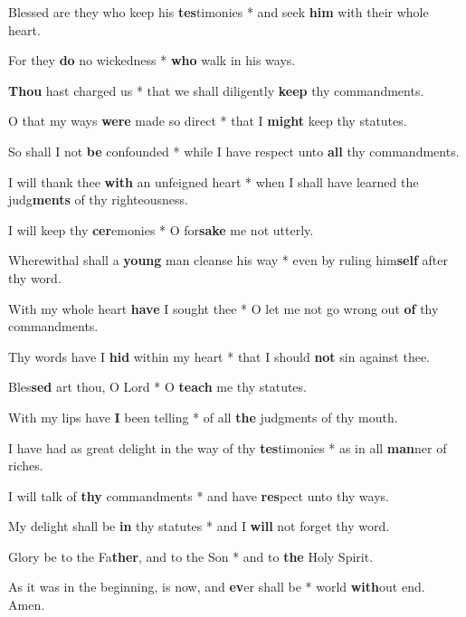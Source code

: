 \begin{multicols}{2}
	Blessed are they who keep his \textbf{tes}timonies * and seek \textbf{him} with their whole heart.
	
	For they \textbf{do} no wickedness * \textbf{who} walk in his ways.
	
	\textbf{Thou} hast charged us * that we shall diligently \textbf{keep} thy commandments.
	
	O that my ways \textbf{were} made so direct * that I \textbf{might} keep thy statutes.
		
	So shall I not \textbf{be} confounded * while I have respect unto \textbf{all} thy commandments.
	
	I will thank thee \textbf{with} an unfeigned heart * when I shall have learned the judg\textbf{ments} of thy righteousness.
	
	I will keep thy \textbf{cer}emonies * O for\textbf{sake} me not utterly.
	
	Wherewithal shall a \textbf{young} man cleanse his way * even by ruling him\textbf{self} after thy word.
	
	With my whole heart \textbf{have} I sought thee * O let me not go wrong out \textbf{of} thy commandments.
	
	Thy words have I \textbf{hid} within my heart * that I should \textbf{not} sin against thee.
	
	Bles\textbf{sed} art thou, O Lord * O \textbf{teach} me thy statutes.
	
	With my lips have \textbf{I} been telling * of all \textbf{the} judgments of thy mouth.
	
	I have had as great delight in the way of thy \textbf{tes}timonies * as in all \textbf{man}ner of riches.
	
	I will talk of \textbf{thy} commandments * and have \textbf{res}pect unto thy ways.
	
	My delight shall be \textbf{in} thy statutes * and I \textbf{will} not forget thy word.
	
	Glory be to the Fa\textbf{ther}, and to the Son * and to \textbf{the} Holy Spirit.
	
	As it was in the beginning, is now, and \textbf{ev}er shall be * world \textbf{with}out end. Amen.
\end{multicols}